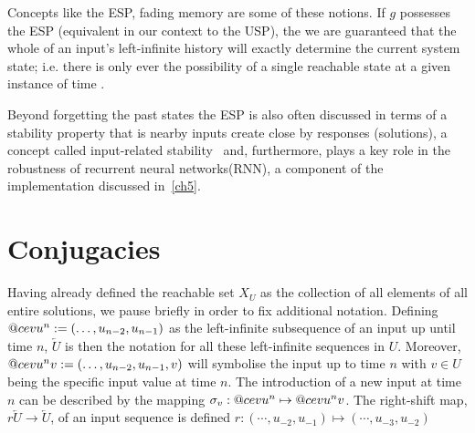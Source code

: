 \documentclass[a4paper,12pt,twoside]{report}
\makeatletter
\DeclareRobustCommand{\cev}[1]{%
  \mathpalette\do@cev{#1}%
}
\newcommand{\do@cev}[2]{%
  \fix@cev{#1}{+}%
  \reflectbox{$\m@th#1\vec{\reflectbox{$\fix@cev{#1}{-}\m@th#1#2\fix@cev{#1}{+}$}}$}%
  \fix@cev{#1}{-}%
}
\newcommand{\fix@cev}[2]{%
  \ifx#1\displaystyle
    \mkern#20mu
  \else
    \ifx#1\textstyle
      \mkern#20mu
    \else
      \ifx#1\scriptstyle
        \mkern#26mu
      \else
        \mkern#26mu
      \fi
    \fi
  \fi
}
\makeatother
\begin{document}
Concepts like the ESP,  fading memory \cite{boyd1985fading} are some of these notions.  
If $g$ possesses the ESP (equivalent in our context to the USP), the we are guaranteed that the whole of an input's left-infinite history will exactly determine the current system state; i.e. there is only ever the possibility of a single reachable state at a given instance of time \cite{jaeger2001echo,Manju_2020}.

Beyond forgetting the past states the ESP is also often discussed in terms of a stability property that is nearby inputs create close by responses (solutions), a concept called input-related stability~\cite{manjunath2020stability} and, furthermore, plays a key role in the robustness of recurrent neural networks(RNN), a component of the implementation discussed in~\ref{ch5}.

\section{Conjugacies}

Having already defined the reachable set $X_U$ as the collection of all elements of all entire solutions, we pause briefly in order to fix additional notation.
Defining $\cev{u}^{n}:=(\ldots,u_{n-2} ,u_{n-1})$ as the left-infinite subsequence of an input up until time $n$, $\overleftarrow{U}$ is then the notation for all these left-infinite sequences in $U$. 
Moreover, $\cev{u}^{n}v:=(\ldots,u_{n-2} ,u_{n-1}, v)$ will symbolise the input up to time $n$ with $v \in U$ being the specific input value at time $n$. 
The introduction of a new input at time $n$ can be described by the mapping $\sigma_v:   \cev{u}^{n} \mapsto \cev{u}^{n}v$. 
The right-shift map, $r\overleftarrow{U}\to\overleftarrow{U}$, of an input sequence is defined $r: (\cdots, u_{-2},u_{-1}) \mapsto(\cdots, u_{-3},u_{-2})$
\end{document}

